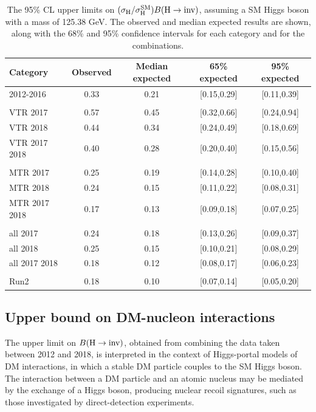 \begin{table}[h!]
    \centering
    \caption{The 95\% CL upper limits on ${(\sigma_{\mathrm{H}}/\sigma_{\mathrm{H}}^{\mathrm{SM}}) {B(\textrm{H}\rightarrow\text{inv})}}$, assuming a SM Higgs boson with a mass of 125.38 GeV. 
    The observed and median expected results are shown, along with the 68\% and 95\% confidence intervals for each 
    category and for the combinations.}
    \label{tab:limits}
    \def\arraystretch{1.05}
    \begin{tabular}{l c c c c}
       \hline
       Category & Observed & Median expected  & 65\% expected & 95\% expected \\
       \hline
          2012-2016  & 0.33  & 0.21  & [0.15,0.29]  & [0.11,0.39] \\ \\
          VTR 2017  & 0.57  & 0.45  & [0.32,0.66]  & [0.24,0.94] \\ 
          VTR 2018  & 0.44  & 0.34  & [0.24,0.49]  & [0.18,0.69] \\ 
     VTR 2017 2018  & 0.40  & 0.28  & [0.20,0.40]  & [0.15,0.56] \\ \\
          MTR 2017  & 0.25  & 0.19  & [0.14,0.28]  & [0.10,0.40] \\ 
          MTR 2018  & 0.24  & 0.15  & [0.11,0.22]  & [0.08,0.31] \\ 
     MTR 2017 2018  & 0.17  & 0.13  & [0.09,0.18]  & [0.07,0.25] \\ \\
          all 2017  & 0.24  & 0.18  & [0.13,0.26]  & [0.09,0.37] \\ 
          all 2018  & 0.25  & 0.15  & [0.10,0.21]  & [0.08,0.29] \\ 
     all 2017 2018  & 0.18  & 0.12  & [0.08,0.17]  & [0.06,0.23] \\ \\
              Run2  & 0.18  & 0.10  & [0.07,0.14]  & [0.05,0.20] \\ 
       \hline
    \end{tabular}
\end{table}

\subsection{Upper bound on DM-nucleon interactions}

The upper limit on ${{B}(\textrm{H}\rightarrow\text{inv})}$, obtained from combining the data taken between 2012 and 2018,
is interpreted in the context of Higgs-portal models of DM interactions, in which a stable 
DM particle couples to the SM Higgs boson. The interaction between a DM particle and an
atomic nucleus may be mediated by the exchange of a Higgs boson,
producing nuclear recoil signatures, such as those investigated by
direct-detection experiments. 


